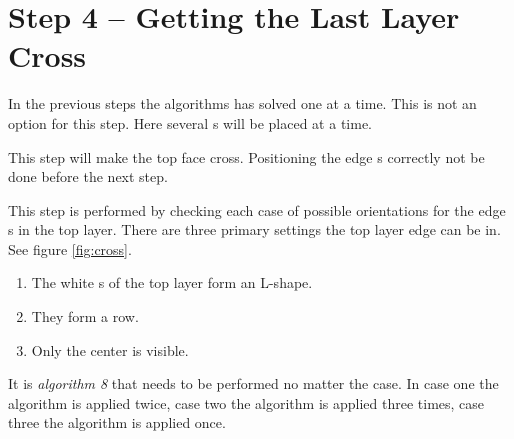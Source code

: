 \section{Step 4 --  Getting the Last Layer Cross}
In the previous steps the algorithms has solved one \cpiece{} at a time. 
This is not an option for this step. 
Here several \cpiece{}s will be placed at a time. 

This step will make the top face cross. 
Positioning the edge \cpiece{}s correctly not be done before the next step. 

This step is performed by checking each case of possible orientations for the edge \cpiece{}s in the top layer. 
There are three primary settings the top layer edge \cpiece{} can be in. See figure \ref{fig:cross}. 
\begin{enumerate}
\item The white \facelet{}s of the top layer form an L-shape.
\item They form a row.
\item Only the center \facelet{} is visible. 
\end{enumerate}
It is \textit{algorithm 8} that needs to be performed no matter the case. In case one the algorithm is applied twice, case two the algorithm is applied three times, case three the algorithm is applied once.